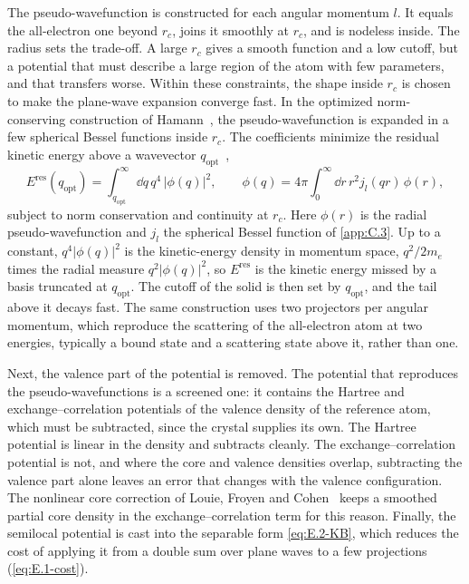 The pseudo-wavefunction is constructed for each angular momentum $l$. It equals the all-electron one beyond $r_c$, joins it smoothly at $r_c$, and is nodeless inside. The radius sets the trade-off. A large $r_c$ gives a smooth function and a low cutoff, but a potential that must describe a large region of the atom with few parameters, and that transfers worse. Within these constraints, the shape inside $r_c$ is chosen to make the plane-wave expansion converge fast. In the optimized norm-conserving construction of Hamann~\cite{hamann2013optimized}, the pseudo-wavefunction is expanded in a few spherical Bessel functions inside $r_c$. The coefficients minimize the residual kinetic energy above a wavevector $q_{\mathrm{opt}}$~\cite[Eq.~(1)]{hamann2013optimized},
\begin{equation}
  E^{\mathrm{res}}(q_{\mathrm{opt}}) = \int_{q_{\mathrm{opt}}}^\infty\dd q\,q^4\,|\phi(q)|^2 , \qquad \phi(q) = 4\pi\int_0^\infty\dd r\,r^2j_l(qr)\,\phi(r) ,
  \label{eq:E.2-residual}
\end{equation}
subject to norm conservation and continuity at $r_c$. Here $\phi(r)$ is the radial pseudo-wavefunction and $j_l$ the spherical Bessel function of \cref{app:C.3}. Up to a constant, $q^4|\phi(q)|^2$ is the kinetic-energy density in momentum space, $q^2/2m_e$ times the radial measure $q^2|\phi(q)|^2$, so $E^{\mathrm{res}}$ is the kinetic energy missed by a basis truncated at $q_{\mathrm{opt}}$. The cutoff of the solid is then set by $q_{\mathrm{opt}}$, and the tail above it decays fast. The same construction uses two projectors per angular momentum, which reproduce the scattering of the all-electron atom at two energies, typically a bound state and a scattering state above it, rather than one.

Next, the valence part of the potential is removed. The potential that reproduces the pseudo-wavefunctions is a screened one: it contains the Hartree and exchange--correlation potentials of the valence density of the reference atom, which must be subtracted, since the crystal supplies its own. The Hartree potential is linear in the density and subtracts cleanly. The exchange--correlation potential is not, and where the core and valence densities overlap, subtracting the valence part alone leaves an error that changes with the valence configuration. The nonlinear core correction of Louie, Froyen and Cohen~\cite{louie1982nonlinear} keeps a smoothed partial core density in the exchange--correlation term for this reason. Finally, the semilocal potential is cast into the separable form \cref{eq:E.2-KB}, which reduces the cost of applying it from a double sum over plane waves to a few projections (\cref{eq:E.1-cost}).

